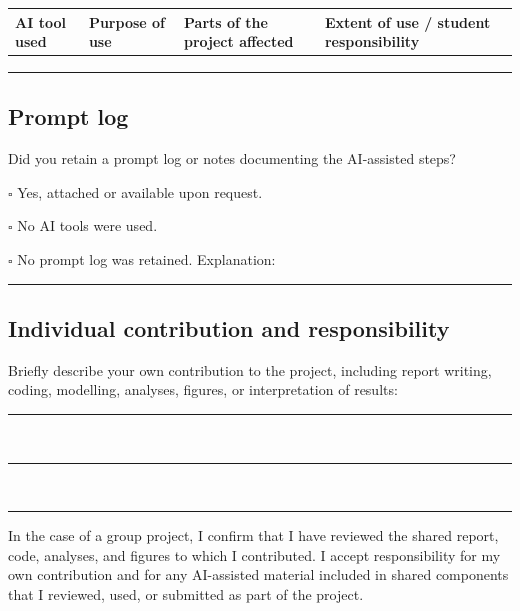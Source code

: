 \documentclass[11pt]{article}
\begin{document}
\medskip

\begin{tabularx}{\textwidth}{|
>{\raggedright\arraybackslash}X|
>{\raggedright\arraybackslash}X|
>{\raggedright\arraybackslash}X|
>{\raggedright\arraybackslash}X|}
\hline
\textbf{AI tool used} &
\textbf{Purpose of use} &
\textbf{Parts of the project affected} &
\textbf{Extent of use / student responsibility} \\
\hline
 & & & \\
[2.5em]
\hline
 & & & \\
[2.5em]
\hline
 & & & \\
[2.5em]
\hline
\end{tabularx}

\bigskip

\subsection*{Prompt log}

\noindent
Did you retain a prompt log or notes documenting the AI-assisted steps?

\medskip

\noindent
$\square$ Yes, attached or available upon request.

\noindent
$\square$ No AI tools were used.

\noindent
$\square$ No prompt log was retained. Explanation:
\rule{0.75\textwidth}{0.4pt}

\bigskip

\subsection*{Individual contribution and responsibility}

\noindent
Briefly describe your own contribution to the project, including report writing,
coding, modelling, analyses, figures, or interpretation of results:

\medskip

\noindent
\rule{\textwidth}{0.4pt}\\[1.2em]
\rule{\textwidth}{0.4pt}\\[1.2em]
\rule{\textwidth}{0.4pt}

\bigskip

\noindent
In the case of a group project, I confirm that I have reviewed the shared report,
code, analyses, and figures to which I contributed. I accept responsibility for my
own contribution and for any AI-assisted material included in shared components
that I reviewed, used, or submitted as part of the project.
\end{document}
